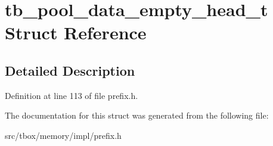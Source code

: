 \hypertarget{structtb__pool__data__empty__head__t}{\section{tb\-\_\-pool\-\_\-data\-\_\-empty\-\_\-head\-\_\-t Struct Reference}
\label{structtb__pool__data__empty__head__t}
}


\subsection{Detailed Description}


Definition at line 113 of file prefix.\-h.



The documentation for this struct was generated from the following file\-:\begin{DoxyCompactItemize}
\item 
src/tbox/memory/impl/prefix.\-h\end{DoxyCompactItemize}
